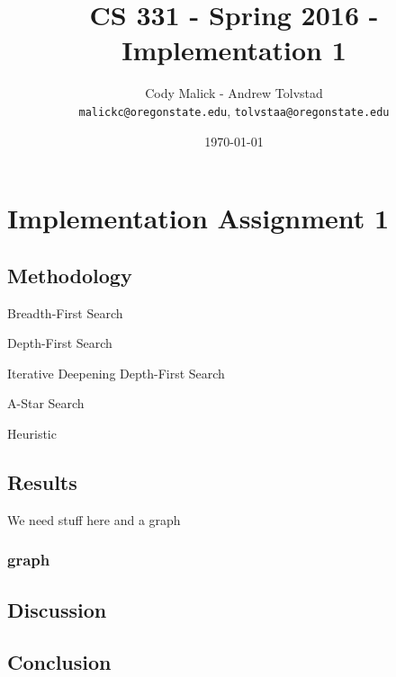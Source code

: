 \documentclass[10pt,letterpaper]{article}
\begin{document}
\begin{titlepage}
  \title{CS 331 - Spring 2016 - Implementation 1}
  \author{Cody Malick - Andrew Tolvstad\\
  \texttt{malickc@oregonstate.edu}, \texttt{tolvstaa@oregonstate.edu}}
  \date{\today}
  \maketitle
  \vspace*{2cm}

\end{titlepage}

\section{Implementation Assignment 1}
  \subsection{Methodology}
    \begin{description}
      \item Breadth-First Search
      \item Depth-First Search
      \item Iterative Deepening Depth-First Search
      \item A-Star Search
        \begin{description}
          \item Heuristic
        \end{description}
    \end{description}

  \subsection{Results}
  We need stuff here and a graph
  \subsubsection{graph}
    \begin{center}
  \end{center}

  \subsection{Discussion}
  \subsection{Conclusion}
\end{document}
